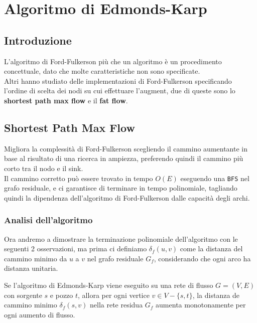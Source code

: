 \chapter{Algoritmo di Edmonds-Karp}
\section{Introduzione}
L'algoritmo di Ford-Fulkerson più che un algoritmo è un procedimento
concettuale, dato che molte caratteristiche non sono specificate.\\

Altri hanno studiato delle implementazioni di Ford-Fulkerson specificando
l'ordine di scelta dei nodi su cui effettuare l'augment, due di queste sono lo
\textbf{shortest path max flow} e il \textbf{fat flow}.


\section{Shortest Path Max Flow}
Migliora la complessità di Ford-Fulkerson scegliendo il cammino aumentante in
base al risultato di una ricerca in ampiezza, preferendo quindi il cammino più
corto tra il nodo e il sink.\\

Il cammino corretto può essere trovato in tempo $O(E)$ eseguendo una
\texttt{BFS} nel grafo residuale, e ci garantisce di terminare in tempo
polinomiale, tagliando quindi la dipendenza dell'algoritmo di Ford-Fulkerson
dalle capacità degli archi.

\subsection{Analisi dell'algoritmo}
Ora andremo a dimostrare la terminazione polinomiale dell'algoritmo con le
seguenti 2 osservazioni, ma prima ci definiamo $\delta_f(u,v)$ come la distanza
del cammino minimo da $u$ a $v$ nel grafo residuale $G_f$, considerando che ogni
arco ha distanza unitaria.

\begin{myblockquote}
  \begin{minipage}{\textwidth}
    \begin{theorem}
      Se l'algoritmo di Edmonds-Karp viene eseguito su una rete di flusso
      $G = (V, E)$ con sorgente $s$ e pozzo $t$, allora per ogni
      vertice $v \in V - \{s,t\}$, la distanza de cammino minimo
      $\delta_f(s,v)$ nella rete residua $G_f$ aumenta \linebreak
      monotonamente per ogni aumento di flusso.
    \end{theorem}
  \end{minipage}
\end{myblockquote}

